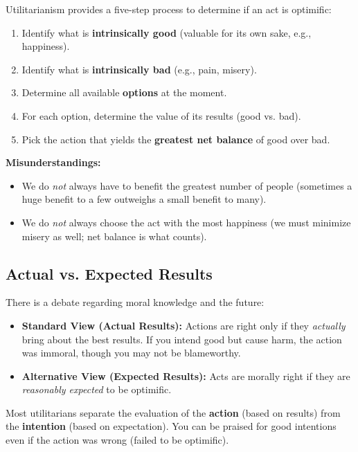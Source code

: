 \begin{readingnotes}
	Utilitarianism provides a five-step process to determine if an act is optimific:
	\begin{enumerate}
		\item Identify what is \textbf{intrinsically good} (valuable for its own sake, e.g., happiness).
		\item Identify what is \textbf{intrinsically bad} (e.g., pain, misery).
		\item Determine all available \textbf{options} at the moment.
		\item For each option, determine the value of its results (good vs. bad).
		\item Pick the action that yields the \textbf{greatest net balance} of good over bad.
	\end{enumerate}

	\textbf{Misunderstandings:}
	\begin{itemize}
		\item We do \textit{not} always have to benefit the greatest number of people (sometimes a huge benefit to a few outweighs a small benefit to many).
		\item We do \textit{not} always choose the act with the most happiness (we must minimize misery as well; net balance is what counts).
	\end{itemize}
\end{readingnotes}

\subsection{Actual vs. Expected Results}

\begin{readingnotes}
	There is a debate regarding moral knowledge and the future:
	\begin{itemize}
		\item \textbf{Standard View (Actual Results):} Actions are right only if they \textit{actually} bring about the best results. If you intend good but cause harm, the action was immoral, though you may not be blameworthy.
		\item \textbf{Alternative View (Expected Results):} Acts are morally right if they are \textit{reasonably expected} to be optimific.
	\end{itemize}

	Most utilitarians separate the evaluation of the \textbf{action} (based on results) from the \textbf{intention} (based on expectation). You can be praised for good intentions even if the action was wrong (failed to be optimific).
\end{readingnotes}

